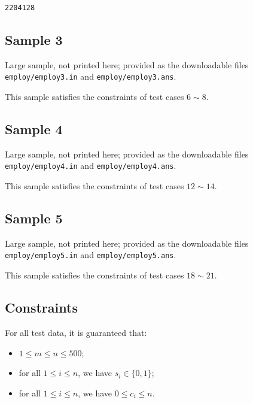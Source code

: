 \documentclass[11pt]{article}
\begin{document}
\begin{verbatim}
2204128
\end{verbatim}

\subsection*{Sample 3}

Large sample, not printed here;
provided as the downloadable files \texttt{employ/employ3.in} and \texttt{employ/employ3.ans}.

This sample satisfies the constraints of test cases $6 \sim 8$.

\subsection*{Sample 4}

Large sample, not printed here;
provided as the downloadable files \texttt{employ/employ4.in} and \texttt{employ/employ4.ans}.

This sample satisfies the constraints of test cases $12 \sim 14$.

\subsection*{Sample 5}

Large sample, not printed here;
provided as the downloadable files \texttt{employ/employ5.in} and \texttt{employ/employ5.ans}.

This sample satisfies the constraints of test cases $18 \sim 21$.

\subsection*{Constraints}

For all test data, it is guaranteed that:
\begin{itemize}
\item $1 \le m \le n \le 500$;
\item for all $1 \le i \le n$, we have $s_i \in \{0, 1\}$;
\item for all $1 \le i \le n$, we have $0 \le c_i \le n$.
\end{itemize}
\end{document}
